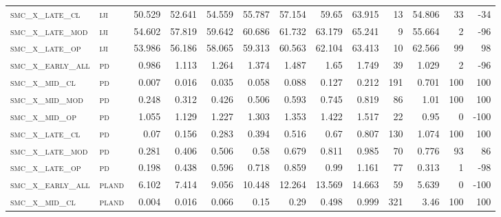 \begin{landscape}
\begin{center}
\begin{footnotesize}
\begin{longtable}{llrrrrrrrr|rrr}
\textsc{smc\_x\_late\_cl  } & \textsc{iji       }   & 50.529   & 52.641   & 54.559   & 55.787   & 57.154   & 59.65    & 63.915   & 13     & 54.806        & 33            & -34             \\
\textsc{smc\_x\_late\_mod } & \textsc{iji       }   & 54.602   & 57.819   & 59.642   & 60.686   & 61.732   & 63.179   & 65.241   & 9      & 55.664        & 2             & -96             \\
\textsc{smc\_x\_late\_op  } & \textsc{iji       }   & 53.986   & 56.186   & 58.065   & 59.313   & 60.563   & 62.104   & 63.413   & 10     & 62.566        & 99            & 98              \\
\textsc{smc\_x\_early\_all} & \textsc{pd        }   & 0.986    & 1.113    & 1.264    & 1.374    & 1.487    & 1.65     & 1.749    & 39     & 1.029         & 2             & -96             \\
\textsc{smc\_x\_mid\_cl   } & \textsc{pd        }   & 0.007    & 0.016    & 0.035    & 0.058    & 0.088    & 0.127    & 0.212    & 191    & 0.701         & 100           & 100             \\
\textsc{smc\_x\_mid\_mod  } & \textsc{pd        }   & 0.248    & 0.312    & 0.426    & 0.506    & 0.593    & 0.745    & 0.819    & 86     & 1.01          & 100           & 100             \\
\textsc{smc\_x\_mid\_op   } & \textsc{pd        }   & 1.055    & 1.129    & 1.227    & 1.303    & 1.353    & 1.422    & 1.517    & 22     & 0.95          & 0             & -100            \\
\textsc{smc\_x\_late\_cl  } & \textsc{pd        }   & 0.07     & 0.156    & 0.283    & 0.394    & 0.516    & 0.67     & 0.807    & 130    & 1.074         & 100           & 100             \\
\textsc{smc\_x\_late\_mod } & \textsc{pd        }   & 0.281    & 0.406    & 0.506    & 0.58     & 0.679    & 0.811    & 0.985    & 70     & 0.776         & 93            & 86              \\
\textsc{smc\_x\_late\_op  } & \textsc{pd        }   & 0.198    & 0.438    & 0.596    & 0.718    & 0.859    & 0.99     & 1.161    & 77     & 0.313         & 1             & -98             \\
\textsc{smc\_x\_early\_all} & \textsc{pland     }   & 6.102    & 7.414    & 9.056    & 10.448   & 12.264   & 13.569   & 14.663   & 59     & 5.639         & 0             & -100            \\
\textsc{smc\_x\_mid\_cl   } & \textsc{pland     }   & 0.004    & 0.016    & 0.066    & 0.15     & 0.29     & 0.498    & 0.999    & 321    & 3.46          & 100           & 100             \\

\end{longtable}
\end{footnotesize}
\end{center}
\end{landscape}
